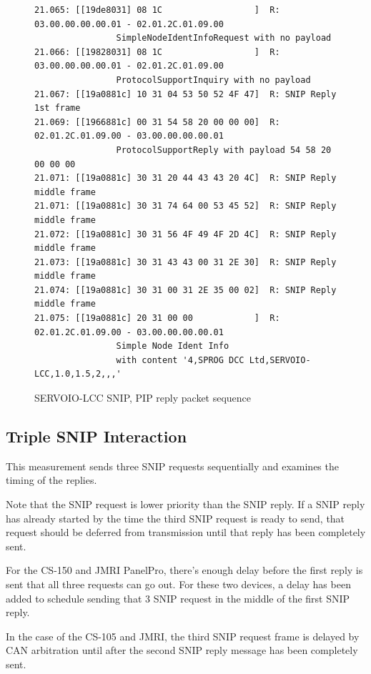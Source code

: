 \documentclass[11pt]{article}
\begin{document}
\cbstart
\begin{figure}[!htbp]
\begin{verbatim}
21.065: [[19de8031] 08 1C                  ]  R: 03.00.00.00.00.01 - 02.01.2C.01.09.00 
                SimpleNodeIdentInfoRequest with no payload
21.066: [[19828031] 08 1C                  ]  R: 03.00.00.00.00.01 - 02.01.2C.01.09.00 
                ProtocolSupportInquiry with no payload
21.067: [[19a0881c] 10 31 04 53 50 52 4F 47]  R: SNIP Reply 1st frame
21.069: [[1966881c] 00 31 54 58 20 00 00 00]  R: 02.01.2C.01.09.00 - 03.00.00.00.00.01 
                ProtocolSupportReply with payload 54 58 20 00 00 00
21.071: [[19a0881c] 30 31 20 44 43 43 20 4C]  R: SNIP Reply middle frame
21.071: [[19a0881c] 30 31 74 64 00 53 45 52]  R: SNIP Reply middle frame
21.072: [[19a0881c] 30 31 56 4F 49 4F 2D 4C]  R: SNIP Reply middle frame
21.073: [[19a0881c] 30 31 43 43 00 31 2E 30]  R: SNIP Reply middle frame
21.074: [[19a0881c] 30 31 00 31 2E 35 00 02]  R: SNIP Reply middle frame
21.075: [[19a0881c] 20 31 00 00            ]  R: 02.01.2C.01.09.00 - 03.00.00.00.00.01 
                Simple Node Ident Info 
                with content '4,SPROG DCC Ltd,SERVOIO-LCC,1.0,1.5,2,,,'
\end{verbatim}
\caption{SERVOIO-LCC SNIP, PIP reply packet sequence}
\label{fig:SERVOIO_SNIP_PIP_reply_sequence}
\end{figure}
\cbend

\clearpage

\subsection{Triple SNIP Interaction}

This measurement sends three SNIP requests sequentially and examines the timing of the replies.

Note that the SNIP request is lower priority than the SNIP reply. 
If a SNIP reply has already started by the time the third SNIP request is ready to send,
that request should be deferred from transmission until that reply has been completely sent.

For the CS-150 and JMRI PanelPro, there's enough delay before the first reply is 
sent that all three requests can go out.  
For these two devices, a delay has been added to schedule sending that 
3 SNIP request in the middle of the first SNIP reply.

In the case of the CS-105 and JMRI, 
the third SNIP request frame is delayed by CAN arbitration until after the
second SNIP reply message has been completely sent.
\end{document}
